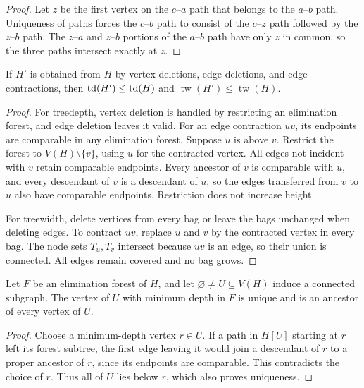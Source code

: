 \begin{proof}
Let $z$ be the first vertex on the $c$--$a$ path that belongs to
the $a$--$b$ path. Uniqueness of paths forces the $c$--$b$ path
to consist of the $c$--$z$ path followed by the $z$--$b$ path.
The $z$--$a$ and $z$--$b$ portions of the $a$--$b$ path have only
$z$ in common, so the three paths intersect exactly at $z$.
\end{proof}

\begin{lemma}
\label{lem:minor-monotonicity}
If $H'$ is obtained from $H$ by vertex deletions, edge deletions,
and edge contractions, then
$\operatorname{td}(H')\leq\operatorname{td}(H)$ and
$\operatorname{tw}(H')\leq\operatorname{tw}(H)$.
\end{lemma}

\begin{proof}
For treedepth, vertex deletion is handled by restricting an
elimination forest, and edge deletion leaves it valid. For an edge
contraction $uv$, its endpoints are comparable in any elimination
forest. Suppose $u$ is above $v$. Restrict the forest to
$V(H)\setminus\{v\}$, using $u$ for the contracted vertex. All
edges not incident with $v$ retain comparable endpoints. Every
ancestor of $v$ is comparable with $u$, and every descendant of $v$
is a descendant of $u$, so the edges transferred from $v$ to $u$
also have comparable endpoints. Restriction does not increase height.

For treewidth, delete vertices from every bag or leave the bags
unchanged when deleting edges. To contract $uv$, replace $u$ and $v$
by the contracted vertex in every bag. The node sets $T_u,T_v$
intersect because $uv$ is an edge, so their union is connected. All
edges remain covered and no bag grows.
\end{proof}

\begin{lemma}
\label{lem:connected-set-ancestor}
Let $F$ be an elimination forest of $H$, and let
$\varnothing\ne U\subseteq V(H)$ induce a connected subgraph.
The vertex of $U$ with minimum depth in $F$ is unique and is an
ancestor of every vertex of $U$.
\end{lemma}

\begin{proof}
Choose a minimum-depth vertex $r\in U$. If a path in $H[U]$ starting
at $r$ left its forest subtree, the first edge leaving it would join
a descendant of $r$ to a proper ancestor of $r$, since its endpoints
are comparable. This contradicts the choice of $r$. Thus all of $U$
lies below $r$, which also proves uniqueness.
\end{proof}
